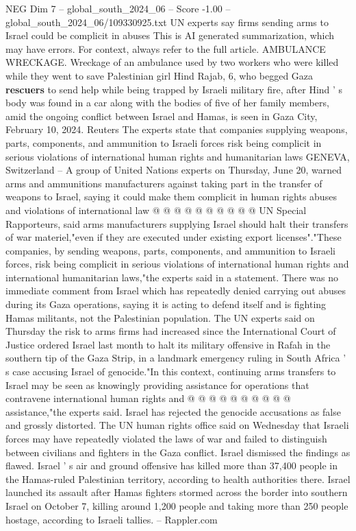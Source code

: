 \begin{textsample}{NEG Dim 7 – global\_south\_2024\_06 – Score -1.00 – global\_south\_2024\_06/109330925.txt}  \label{ex:f7_neg_211}
UN experts say firms sending arms to Israel could be complicit in abuses This is AI generated summarization, which may have errors.
For context, always refer to the full article.
AMBULANCE WRECKAGE.
Wreckage of an ambulance used by two workers who were killed while they went to save Palestinian girl Hind Rajab, 6, who begged Gaza \textbf{rescuers} to send help while being trapped by Israeli military fire, after Hind ' s body was found in a car along with the bodies of five of her family members, amid the ongoing conflict between Israel and Hamas, is seen in Gaza City, February 10, 2024.
Reuters The experts state that companies supplying weapons, parts, components, and ammunition to Israeli forces risk being complicit in serious violations of international human rights and humanitarian laws GENEVA, Switzerland -- A group of United Nations experts on Thursday, June 20, warned arms and ammunitions manufacturers against taking part in the transfer of weapons to Israel, saying it could make them complicit in human rights abuses and violations of international law @ @ @ @ @ @ @ @ @ @ UN Special Rapporteurs, said arms manufacturers supplying Israel should halt their transfers of war materiel,"even if they are executed under existing export licenses"."These companies, by sending weapons, parts, components, and ammunition to Israeli forces, risk being complicit in serious violations of international human rights and international humanitarian laws,"the experts said in a statement.
There was no immediate comment from Israel which has repeatedly denied carrying out abuses during its Gaza operations, saying it is acting to defend itself and is fighting Hamas militants, not the Palestinian population.
The UN experts said on Thursday the risk to arms firms had increased since the International Court of Justice ordered Israel last month to halt its military offensive in Rafah in the southern tip of the Gaza Strip, in a landmark emergency ruling in South Africa ' s case accusing Israel of genocide."In this context, continuing arms transfers to Israel may be seen as knowingly providing assistance for operations that contravene international human rights and @ @ @ @ @ @ @ @ @ @ assistance,"the experts said.
Israel has rejected the genocide accusations as false and grossly distorted.
The UN human rights office said on Wednesday that Israeli forces may have repeatedly violated the laws of war and failed to distinguish between civilians and fighters in the Gaza conflict.
Israel dismissed the findings as flawed.
Israel ' s air and ground offensive has killed more than 37,400 people in the Hamas-ruled Palestinian territory, according to health authorities there.
Israel launched its assault after Hamas fighters stormed across the border into southern Israel on October 7, killing around 1,200 people and taking more than 250 people hostage, according to Israeli tallies. -- Rappler.com

\end{textsample}
